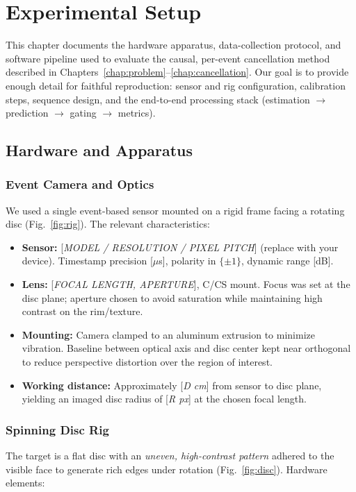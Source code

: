 \chapter{Experimental Setup}
\label{chap:setup}

This chapter documents the hardware apparatus, data-collection protocol, and software pipeline used to evaluate the causal, per-event cancellation method described in Chapters~\ref{chap:problem}--\ref{chap:cancellation}. Our goal is to provide enough detail for faithful reproduction: sensor and rig configuration, calibration steps, sequence design, and the end-to-end processing stack (estimation $\rightarrow$ prediction $\rightarrow$ gating $\rightarrow$ metrics).

\section{Hardware and Apparatus}
\label{sec:hardware}

\subsection{Event Camera and Optics}
We used a single event-based sensor mounted on a rigid frame facing a rotating disc (Fig.~\ref{fig:rig}). The relevant characteristics:

\begin{itemize}
  \item \textbf{Sensor:} [\textit{MODEL / RESOLUTION / PIXEL PITCH}] (replace with your device). Timestamp precision [$\mu$s], polarity in $\{\pm1\}$, dynamic range [dB].
  \item \textbf{Lens:} [\textit{FOCAL LENGTH, APERTURE}], C/CS mount. Focus was set at the disc plane; aperture chosen to avoid saturation while maintaining high contrast on the rim/texture.
  \item \textbf{Mounting:} Camera clamped to an aluminum extrusion to minimize vibration. Baseline between optical axis and disc center kept near orthogonal to reduce perspective distortion over the region of interest.
  \item \textbf{Working distance:} Approximately [\textit{D cm}] from sensor to disc plane, yielding an imaged disc radius of [\textit{R px}] at the chosen focal length.
\end{itemize}

\subsection{Spinning Disc Rig}
The target is a flat disc with an \emph{uneven, high-contrast pattern} adhered to the visible face to generate rich edges under rotation (Fig.~\ref{fig:disc}). Hardware elements:

